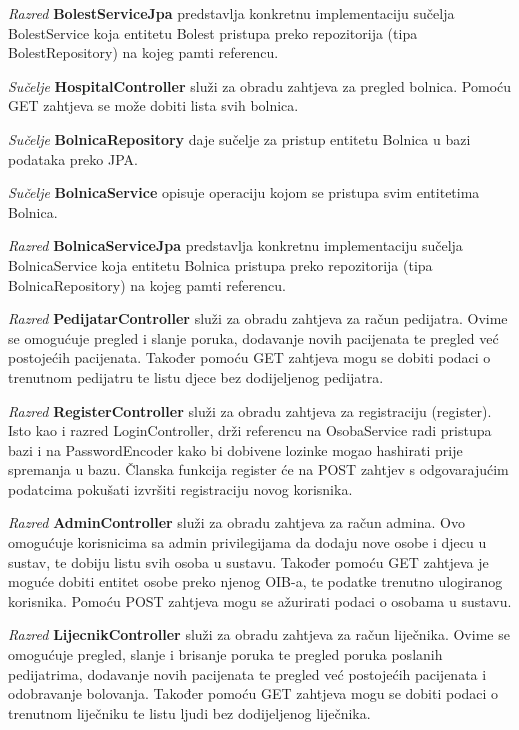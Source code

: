 			\textit{Razred }\textbf{BolestServiceJpa}
			 predstavlja konkretnu implementaciju sučelja BolestService koja entitetu Bolest
			pristupa preko repozitorija (tipa BolestRepository) na kojeg pamti referencu.
			
			\textit{Sučelje }\textbf{HospitalController}
			služi za obradu zahtjeva za pregled bolnica. Pomoću GET zahtjeva se može dobiti lista svih bolnica.
			
			\textit{Sučelje }\textbf{BolnicaRepository}
			daje sučelje za pristup entitetu Bolnica u bazi podataka preko JPA.
			
			\textit{Sučelje }\textbf{BolnicaService}
			opisuje operaciju kojom se pristupa svim entitetima Bolnica.
			
			\textit{Razred }\textbf{BolnicaServiceJpa}
			predstavlja konkretnu implementaciju sučelja BolnicaService koja entitetu Bolnica
			pristupa preko repozitorija (tipa BolnicaRepository) na kojeg pamti referencu.
			
			\textit{Razred }\textbf{PedijatarController}
			 služi za obradu zahtjeva za račun pedijatra. Ovime se omogućuje pregled i slanje poruka, dodavanje novih pacijenata te pregled već postojećih pacijenata. Također pomoću GET zahtjeva mogu se dobiti podaci o trenutnom pedijatru te listu djece bez dodijeljenog pedijatra.
			
			\textit{Razred }\textbf{RegisterController}
			 služi za obradu zahtjeva za registraciju (register).
			Isto kao i razred LoginController, drži referencu na OsobaService radi pristupa bazi i na PasswordEncoder
			kako bi dobivene lozinke mogao hashirati prije spremanja u bazu. Članska funkcija register će na POST
			zahtjev s odgovarajućim podatcima pokušati izvršiti registraciju novog korisnika. 
			
			\textit{Razred }\textbf{AdminController}
			 služi za obradu zahtjeva za račun admina. Ovo omogućuje korisnicima sa admin privilegijama da dodaju nove osobe i djecu u sustav, te dobiju listu svih osoba u sustavu. Također pomoću GET zahtjeva je moguće dobiti entitet osobe preko njenog OIB-a, te podatke trenutno ulogiranog korisnika. Pomoću POST zahtjeva mogu se ažurirati podaci o osobama u sustavu.
			 
			 \textit{Razred }\textbf{LijecnikController}
			 služi za obradu zahtjeva za račun liječnika. Ovime se omogućuje pregled, slanje i brisanje poruka te pregled poruka poslanih pedijatrima, dodavanje novih pacijenata te pregled već postojećih pacijenata i odobravanje bolovanja. Također pomoću GET zahtjeva mogu se dobiti podaci o trenutnom liječniku te listu ljudi bez dodijeljenog liječnika.
			 
